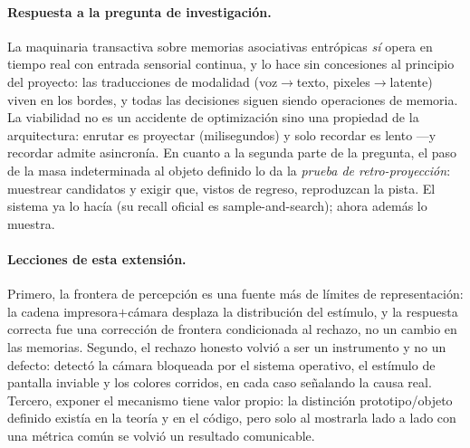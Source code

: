 \paragraph{Respuesta a la pregunta de investigación.}
La maquinaria transactiva sobre memorias asociativas entrópicas \emph{sí} opera en
tiempo real con entrada sensorial continua, y lo hace sin concesiones al principio del
proyecto: las traducciones de modalidad (voz$\to$texto, pixeles$\to$latente) viven en
los bordes, y todas las decisiones siguen siendo operaciones de memoria.
La viabilidad no es un accidente de optimización sino una propiedad de la
arquitectura: enrutar es proyectar (milisegundos) y solo recordar es lento
---y recordar admite asincronía.
En cuanto a la segunda parte de la pregunta, el paso de la masa indeterminada al
objeto definido lo da la \emph{prueba de retro-proyección}: muestrear candidatos y
exigir que, vistos de regreso, reproduzcan la pista.
El sistema ya lo hacía (su recall oficial es sample-and-search); ahora además lo
muestra.

\paragraph{Lecciones de esta extensión.}
Primero, la frontera de percepción es una fuente más de límites de representación: la
cadena impresora$+$cámara desplaza la distribución del estímulo, y la respuesta
correcta fue una corrección de frontera condicionada al rechazo, no un cambio en las
memorias.
Segundo, el rechazo honesto volvió a ser un instrumento y no un defecto: detectó la
cámara bloqueada por el sistema operativo, el estímulo de pantalla inviable y los
colores corridos, en cada caso señalando la causa real.
Tercero, exponer el mecanismo tiene valor propio: la distinción prototipo/objeto
definido existía en la teoría y en el código, pero solo al mostrarla lado a lado con
una métrica común se volvió un resultado comunicable.

